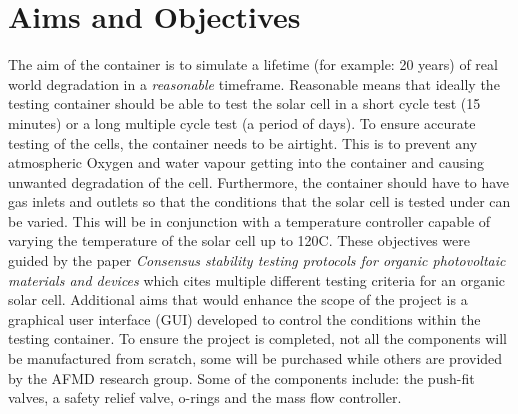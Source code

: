 \documentclass[a4paper,11pt]{article}
\begin{document}
\section{Aims and Objectives}
The aim of the container is to simulate a lifetime (for example: 20 years) of real world degradation in a \emph{reasonable} timeframe. Reasonable means that ideally the testing container should be able to test the solar cell in a short cycle test (15 minutes) or a long multiple cycle test (a period of days). To ensure accurate testing of the cells, the container needs to be airtight. This is to prevent any atmospheric Oxygen and water vapour getting into the container and causing unwanted degradation of the cell. Furthermore, the container should have to have gas inlets and outlets so that the conditions that the solar cell is tested under can be varied. This will be in conjunction with a temperature controller capable of varying the temperature of the solar cell up to 120\textdegree C. These objectives were guided by the paper \emph{Consensus stability testing protocols for organic photovoltaic materials and devices} \cite[p.~1255-1261]{RN47} which cites multiple different testing criteria for an organic solar cell. Additional aims that would enhance the scope of the project is a graphical user interface (GUI) developed to control the conditions within the testing container. To ensure the project is completed, not all the components will be manufactured from scratch, some will be purchased while others are provided by the AFMD research group. Some of the components include: the push-fit valves, a safety relief valve, o-rings and the mass flow controller.
\end{document}
